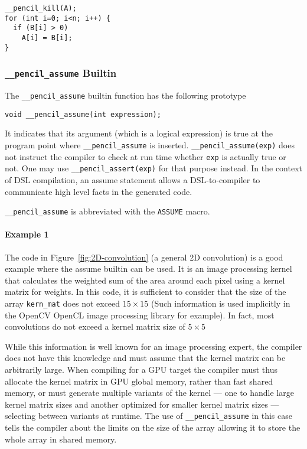 \begin{lstlisting}[language=pencil]
__pencil_kill(A);
for (int i=0; i<n; i++) {
  if (B[i] > 0)
    A[i] = B[i];
}
\end{lstlisting}

\subsubsection{\texttt{\_\_pencil\_assume} Builtin}


The \lstinline!__pencil_assume! builtin function has the following prototype

  \lstinline!void __pencil_assume(int expression);!

  It indicates that its argument (which is a logical expression) is true at
  the program point where \lstinline!__pencil_assume! is inserted.
  \lstinline!__pencil_assume(exp)! does not instruct the compiler to check at
  run time whether \lstinline!exp! is actually true or not.
  One may use \lstinline!__pencil_assert(exp)! for that purpose instead.
  In the context of DSL compilation, an assume statement allows a
  DSL-to-\pencil compiler to communicate high level facts in the generated
  code.

  \lstinline!__pencil_assume! is abbreviated with the \lstinline!ASSUME! macro.
  
\paragraph{Example 1}
The code in Figure~\ref{fig:2D-convolution} (a general 2D convolution)  is a
good example where the assume builtin can be used.  It is an image
processing kernel that calculates the weighted sum of the area around each
pixel using a kernel matrix for weights.
In this code, it is sufficient to consider that the size of the array
\lstinline!kern_mat! does not exceed $15\times15$ (Such information is
used implicitly in the OpenCV OpenCL image processing library for example).
In fact, most convolutions do not exceed a kernel matrix size of $5\times5$

While this information is well known for an image processing expert, the
compiler does not have this knowledge and must assume that the kernel matrix
can be arbitrarily large.  When compiling for a GPU  target the compiler must
thus allocate the kernel matrix in GPU global memory, rather than fast shared
memory, or must generate multiple variants of the kernel --- one to handle large
kernel matrix sizes and another optimized for smaller kernel matrix
sizes --- selecting between variants at runtime.
The use of \lstinline!__pencil_assume! in this case tells the compiler
about the limits on the size of the array allowing it to store
the whole array in shared memory.

